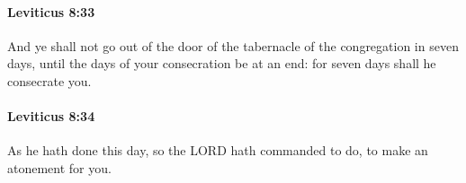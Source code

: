 		\paragraph{Leviticus 8:33} %
			\label{LEVITICUS-8-33}

			And ye shall not go out of the door of the tabernacle of the congregation in seven days, until the days of your consecration be at an end: for seven days shall he consecrate you.


		\paragraph{Leviticus 8:34} %
			\label{LEVITICUS-8-34}

			As he hath done this day, so the LORD hath commanded to do, to make an atonement for you.


